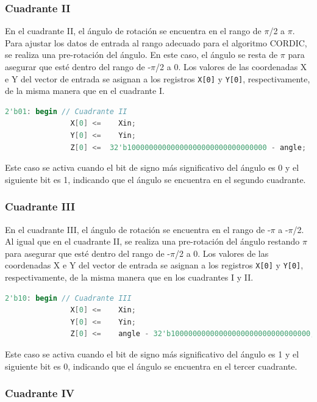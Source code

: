 \documentclass[12pt,a4paper, twoside]{article} %
\begin{document}
\subsubsection{Cuadrante II}

En el cuadrante II, el ángulo de rotación se encuentra en el rango de $\pi$/2 a $\pi$. Para ajustar los datos de entrada al rango adecuado para el algoritmo CORDIC, se realiza una pre-rotación del ángulo. En este caso, el ángulo se resta de $\pi$ para asegurar que esté dentro del rango de -$\pi$/2 a 0. Los valores de las coordenadas X e Y del vector de entrada se asignan a los registros \texttt{X[0]} y \texttt{Y[0]}, respectivamente, de la misma manera que en el cuadrante I.

\begin{lstlisting}[language=Verilog]
       2'b01: begin // Cuadrante II
               X[0] <=    Xin;
               Y[0] <=    Yin;
               Z[0] <=  32'b10000000000000000000000000000000 - angle;                  
\end{lstlisting}

Este caso se activa cuando el bit de signo más significativo del ángulo es 0 y el siguiente bit es 1, indicando que el ángulo se encuentra en el segundo cuadrante.

\subsubsection{Cuadrante III}

En el cuadrante III, el ángulo de rotación se encuentra en el rango de -$\pi$ a -$\pi$/2. Al igual que en el cuadrante II, se realiza una pre-rotación del ángulo restando $\pi$ para asegurar que esté dentro del rango de -$\pi$/2 a 0. Los valores de las coordenadas X e Y del vector de entrada se asignan a los registros \texttt{X[0]} y \texttt{Y[0]}, respectivamente, de la misma manera que en los cuadrantes I y II.

\begin{lstlisting}[language=Verilog]
       2'b10: begin // Cuadrante III
               X[0] <=    Xin;
               Y[0] <=    Yin;
               Z[0] <=    angle - 32'b10000000000000000000000000000000; 
\end{lstlisting}

Este caso se activa cuando el bit de signo más significativo del ángulo es 1 y el siguiente bit es 0, indicando que el ángulo se encuentra en el tercer cuadrante.

\subsubsection{Cuadrante IV}
\end{document}
